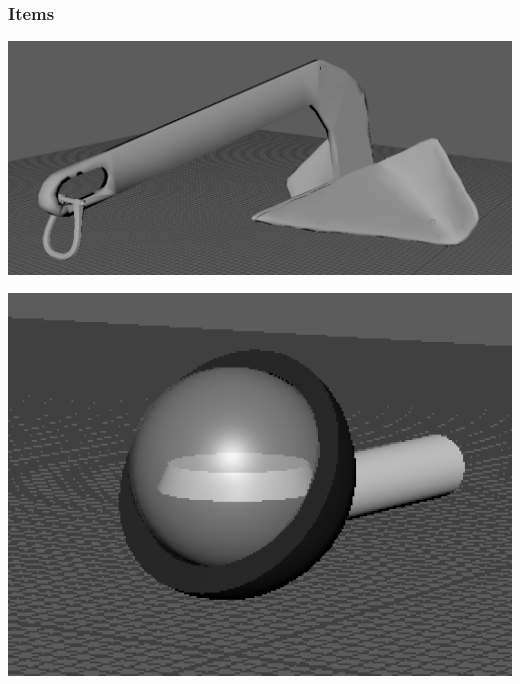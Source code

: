 \documentclass[ %
                    author={Elis Jones},
                supervisor={Dr. Kirsten Cater},
                    degree={BSc},
                     title={The Effect of Presentation Medium on Spatial Cognition},
                  subtitle={in the Virtual Environment},
                      year={2018} ]{dissertation}
\begin{document}
\subsubsection{Items}
\begin{minipage}{\textwidth}
\begin{center}
    \centering
    \begin{minipage}{0.25\textwidth}
        \centering
        \includegraphics[width=1\textwidth]{images/anchor.png}
    \end{minipage}\hfill
    \begin{minipage}{0.25\textwidth}
        \centering
        \includegraphics[width=1\textwidth]{images/compass.png}
    \end{minipage}\hfill
    \begin{minipage}{0.25\textwidth}
        \centering

\end{minipage}
\end{center}
\end{minipage}
\end{document}

